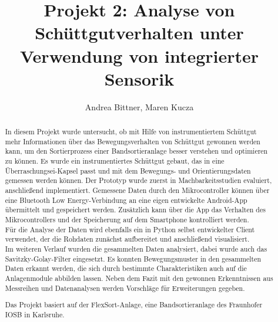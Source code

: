 \documentclass[cover]{isas-seminar}
\title{Projekt 2: Analyse von Schüttgutverhalten unter Verwendung von integrierter Sensorik}
\author{Andrea Bittner, Maren Kucza}
\begin{document}
\maketitle

\begin{abstract}

In diesem Projekt wurde untersucht, ob mit Hilfe von instrumentiertem Schüttgut mehr Informationen über das Bewegungsverhalten von Schüttgut gewonnen werden kann, um den Sortierprozess einer Bandsortieranlage besser verstehen und optimieren zu können. 
Es wurde ein instrumentiertes Schüttgut gebaut, das in eine Überraschungsei-Kapsel passt und mit dem Bewegungs- und Orientierungsdaten gemessen werden können. Der Prototyp wurde zuerst in Machbarkeitsstudien evaluiert, anschließend implementiert. Gemessene Daten durch den Mikrocontroller können über eine Bluetooth Low Energy-Verbindung an eine eigen entwickelte Android-App übermittelt und gespeichert werden. Zusätzlich kann über die App das Verhalten des Mikrocontrollers und der Speicherung auf dem Smartphone kontrolliert werden. \\
Für die Analyse der Daten wird ebenfalls ein in Python selbst entwickelter Client verwendet, der die Rohdaten zunächst aufbereitet und anschließend visualisiert. \\
Im weiteren Verlauf wurden die gesammelten Daten analysiert, dabei wurde auch das Savitzky-Golay-Filter eingesetzt. Es konnten Bewegungsmuster in den gesammelten Daten erkannt werden, die sich durch bestimmte Charakteristiken auch auf die Anlagenmodule abbilden lassen. Neben dem Fazit mit den gewonnen Erkenntnissen aus Messreihen und Datenanalysen werden Vorschläge für Erweiterungen gegeben.

Das Projekt basiert auf der FlexSort-Anlage, eine Bandsortieranlage des Fraunhofer IOSB in Karlsruhe.

\end{abstract}
\clearpage
\tableofcontents
\cleardoublepage




\end{document}
